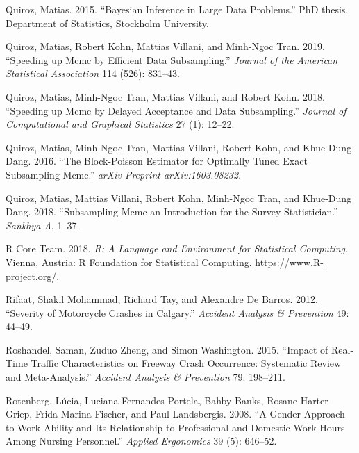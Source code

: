 \documentclass[12pt]{book}
\numberwithin{equation}{chapter}
\begin{document}
\leavevmode\hypertarget{ref-quiroz2015bayesian}{}%
Quiroz, Matias. 2015. ``Bayesian Inference in Large Data Problems.'' PhD thesis, Department of Statistics, Stockholm University.

\leavevmode\hypertarget{ref-quiroz2019speeding}{}%
Quiroz, Matias, Robert Kohn, Mattias Villani, and Minh-Ngoc Tran. 2019. ``Speeding up Mcmc by Efficient Data Subsampling.'' \emph{Journal of the American Statistical Association} 114 (526): 831--43.

\leavevmode\hypertarget{ref-quiroz2018speeding}{}%
Quiroz, Matias, Minh-Ngoc Tran, Mattias Villani, and Robert Kohn. 2018. ``Speeding up Mcmc by Delayed Acceptance and Data Subsampling.'' \emph{Journal of Computational and Graphical Statistics} 27 (1): 12--22.

\leavevmode\hypertarget{ref-quiroz2016block}{}%
Quiroz, Matias, Minh-Ngoc Tran, Mattias Villani, Robert Kohn, and Khue-Dung Dang. 2016. ``The Block-Poisson Estimator for Optimally Tuned Exact Subsampling Mcmc.'' \emph{arXiv Preprint arXiv:1603.08232}.

\leavevmode\hypertarget{ref-quiroz2018subsampling}{}%
Quiroz, Matias, Mattias Villani, Robert Kohn, Minh-Ngoc Tran, and Khue-Dung Dang. 2018. ``Subsampling Mcmc-an Introduction for the Survey Statistician.'' \emph{Sankhya A}, 1--37.

\leavevmode\hypertarget{ref-Rcitation}{}%
R Core Team. 2018. \emph{R: A Language and Environment for Statistical Computing}. Vienna, Austria: R Foundation for Statistical Computing. \url{https://www.R-project.org/}.

\leavevmode\hypertarget{ref-rifaat2012severity}{}%
Rifaat, Shakil Mohammad, Richard Tay, and Alexandre De Barros. 2012. ``Severity of Motorcycle Crashes in Calgary.'' \emph{Accident Analysis \& Prevention} 49: 44--49.

\leavevmode\hypertarget{ref-roshandel2015impact}{}%
Roshandel, Saman, Zuduo Zheng, and Simon Washington. 2015. ``Impact of Real-Time Traffic Characteristics on Freeway Crash Occurrence: Systematic Review and Meta-Analysis.'' \emph{Accident Analysis \& Prevention} 79: 198--211.

\leavevmode\hypertarget{ref-rotenberg2008gender}{}%
Rotenberg, Lúcia, Luciana Fernandes Portela, Bahby Banks, Rosane Harter Griep, Frida Marina Fischer, and Paul Landsbergis. 2008. ``A Gender Approach to Work Ability and Its Relationship to Professional and Domestic Work Hours Among Nursing Personnel.'' \emph{Applied Ergonomics} 39 (5): 646--52.
\end{document}
